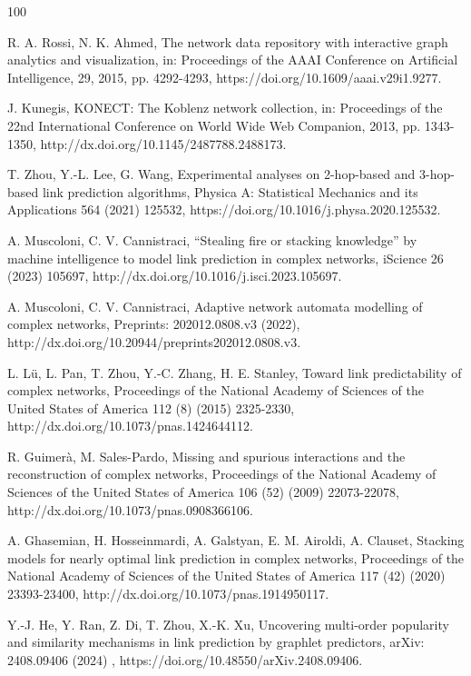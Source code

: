 \documentclass{article}
\begin{document}
\begin{thebibliography}{100}
	
	R. A. Rossi, N. K. Ahmed, The network data repository with interactive graph analytics and visualization, in: Proceedings of the AAAI Conference on Artificial Intelligence, 29, 2015, pp. 4292-4293, https://doi.org/10.1609/aaai.v29i1.9277.
	
	J. Kunegis, KONECT: The Koblenz network collection, in: Proceedings of the 22nd International Conference on World Wide Web Companion, 2013, pp. 1343-1350, http://dx.doi.org/10.1145/2487788.2488173.
	
	T. Zhou, Y.-L. Lee, G. Wang, Experimental analyses on 2-hop-based and 3-hop-based link prediction algorithms, Physica A: Statistical Mechanics and its Applications 564 (2021) 125532, https://doi.org/10.1016/j.physa.2020.125532.
	
	A. Muscoloni, C. V. Cannistraci, ``Stealing fire or stacking knowledge'' by machine intelligence to model link prediction in complex networks, iScience 26 (2023) 105697, http://dx.doi.org/10.1016/j.isci.2023.105697.
	
	A. Muscoloni, C. V. Cannistraci, Adaptive network automata modelling of complex networks, Preprints: 202012.0808.v3 (2022), http://dx.doi.org/10.20944/preprints202012.0808.v3.
	
	L. Lü, L. Pan, T. Zhou, Y.-C. Zhang, H. E. Stanley, Toward link predictability of complex networks, Proceedings of the National Academy of Sciences of the United States of America 112 (8) (2015) 2325-2330, http://dx.doi.org/10.1073/pnas.1424644112.
	
	R. Guimerà, M. Sales-Pardo, Missing and spurious interactions and the reconstruction of complex networks, Proceedings of the National Academy of Sciences of the United States of America 106 (52) (2009) 22073-22078, http://dx.doi.org/10.1073/pnas.0908366106.
	
	A. Ghasemian, H. Hosseinmardi, A. Galstyan, E. M. Airoldi, A. Clauset, Stacking models for nearly optimal link prediction in complex networks, Proceedings of the National Academy of Sciences of the United States of America 117 (42) (2020) 23393-23400, http://dx.doi.org/10.1073/pnas.1914950117.
	
	Y.-J. He, Y. Ran, Z. Di, T. Zhou, X.-K. Xu, Uncovering multi-order popularity and similarity mechanisms in link prediction by graphlet predictors, arXiv: 2408.09406 (2024) , https://doi.org/10.48550/arXiv.2408.09406.
	

\end{thebibliography}
\end{document}
